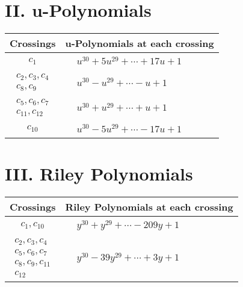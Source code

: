 \documentclass[1p]{elsarticle_modified}
\theoremstyle{definition}
\begin{document}
\newpage\renewcommand{\arraystretch}{1}
\centering \section*{ II. u-Polynomials}
\begin{tabular}{m{50pt}|m{274pt}}
Crossings & \hspace{64pt}u-Polynomials at each crossing \\
\hline $$\begin{aligned}c_{1}\end{aligned}$$&$\begin{aligned}
&u^{30}+5 u^{29}+\cdots+17 u+1
\end{aligned}$\\
\hline $$\begin{aligned}c_{2},c_{3},c_{4}\\c_{8},c_{9}\end{aligned}$$&$\begin{aligned}
&u^{30}- u^{29}+\cdots- u+1
\end{aligned}$\\
\hline $$\begin{aligned}c_{5},c_{6},c_{7}\\c_{11},c_{12}\end{aligned}$$&$\begin{aligned}
&u^{30}+u^{29}+\cdots+u+1
\end{aligned}$\\
\hline $$\begin{aligned}c_{10}\end{aligned}$$&$\begin{aligned}
&u^{30}-5 u^{29}+\cdots-17 u+1
\end{aligned}$\\
\hline
\end{tabular}\newpage\renewcommand{\arraystretch}{1}
\centering \section*{ III. Riley Polynomials}
\begin{tabular}{m{50pt}|m{274pt}}
Crossings & \hspace{64pt}Riley Polynomials at each crossing \\
\hline $$\begin{aligned}c_{1},c_{10}\end{aligned}$$&$\begin{aligned}
&y^{30}+y^{29}+\cdots-209 y+1
\end{aligned}$\\
\hline $$\begin{aligned}c_{2},c_{3},c_{4}\\c_{5},c_{6},c_{7}\\c_{8},c_{9},c_{11}\\c_{12}\end{aligned}$$&$\begin{aligned}
&y^{30}-39 y^{29}+\cdots+3 y+1
\end{aligned}$\\
\hline
\end{tabular}
\vskip 2pc
\end{document}

